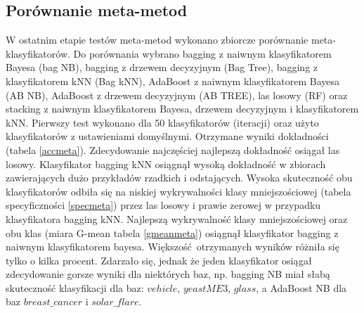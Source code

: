 \subsection{Porównanie meta-metod}
W ostatnim etapie testów meta-metod wykonano zbiorcze porównanie meta-klasyfikatorów. Do porównania wybrano bagging z naiwnym klasyfikatorem Bayesa (bag NB), bagging z drzewem decyzyjnym (Bag Tree), bagging z klasyfikatorem kNN (Bag kNN), AdaBoost z naiwnym klasyfikatorem Bayesa (AB NB), AdaBoost z drzewem decyzyjnym (AB TREE), las losowy (RF) oraz stacking z naiwnym klasyfikatorem Bayesa, drzewem decyzyjnym i klasyfikatorem kNN. Pierwszy test wykonano dla 50 klasyfikatorów (iteracji) oraz użyto klasyfikatorów z ustawieniami domyślnymi. Otrzymane wyniki dokładności (tabela \ref{accmeta}). Zdecydowanie najczęściej najlepszą dokładność osiągał las losowy. Klasyfikator bagging kNN osiągnął wysoką dokładność w zbiorach zawierających dużo przykładów rzadkich i odstających. Wysoka skuteczność obu klasyfikatorów odbiła się na niskiej wykrywalności klasy mniejszościowej (tabela specyficzności \ref{specmeta}) przez las losowy i prawie zerowej w przypadku klasyfikatora bagging kNN. Najlepszą wykrywalność klasy mniejszościowej oraz obu klas (miara G-mean tabela \ref{gmeanmeta}) osiągnął klasyfikator bagging z naiwnym klasyfikatorem bayesa. Większość otrzymanych wyników różniła się tylko o kilka procent. Zdarzało się, jednak że jeden klasyfikator osiągał zdecydowanie gorsze wyniki dla niektórych baz, np. bagging NB miał słabą skuteczność klasyfikacji dla baz: $vehicle$, $yeastME3$, $glass$, a AdaBoost NB dla baz $breast\_cancer$ i $solar\_flare$.

